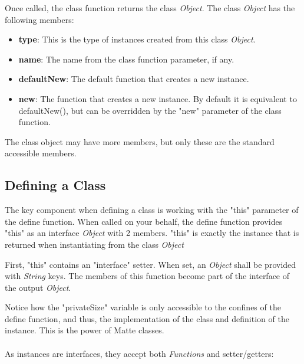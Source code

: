 \documentclass[12pt,letterpaper]{report}
\begin{document}
Once called, the class function returns the class \textit{Object}. The class \textit{Object} has 
the following members:

\begin{itemize}
  \item \textbf{type}: This is the type of instances created from this class \textit{Object}.
  \item \textbf{name}: The name from the class function parameter, if any.
  \item \textbf{defaultNew}: The default function that creates a new instance.
  \item \textbf{new}: The function that creates a new instance. By default it is equivalent to 
  defaultNew(), but can be overridden by the "new" parameter of the class function.
\end{itemize}

The class object may have more members, but only these are the standard accessible members.

\subsection{Defining a Class}\label{Defining a Class}

The key component when defining a class is working with the "this" parameter of the 
define function. When called on your behalf, the define function provides "this" as an
interface \textit{Object} with 2 members. "this" is exactly the instance that is returned when instantiating 
from the class \textit{Object}



First, "this" contains an "interface" setter. When set, an \textit{Object} shall be provided with 
\textit{String} keys. The members of this function become part of the interface of the output
\textit{Object}. 



Notice how the "privateSize" variable is only accessible to the confines of the 
define function, and thus, the implementation of the class and definition of the instance.
This is the power of Matte classes.
\\\\
As instances are interfaces, they accept both \textit{Functions} and setter/getters:


\end{document}
